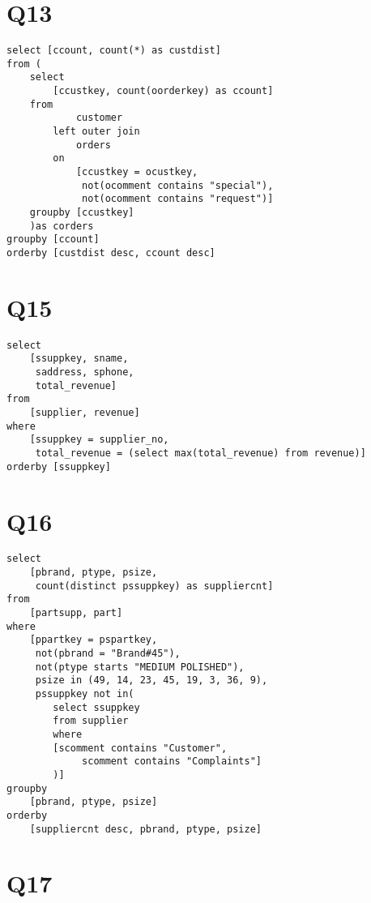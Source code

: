 \clearpage

\section*{Q13}
\label{sec:Q13}

\begin{lstlisting}
select [ccount, count(*) as custdist]
from (
	select
		[ccustkey, count(oorderkey) as ccount]
	from
			customer 
		left outer join 
			orders 
		on
			[ccustkey = ocustkey,
			 not(ocomment contains "special"),
			 not(ocomment contains "request")]
	groupby	[ccustkey]
	)as corders
groupby	[ccount]
orderby	[custdist desc,	ccount desc]
\end{lstlisting}

\clearpage

\section*{Q15}
\label{sec:Q15}

\begin{lstlisting}
select
	[ssuppkey, sname,
	 saddress, sphone,
	 total_revenue]
from
	[supplier, revenue]
where
	[ssuppkey = supplier_no,
	 total_revenue = (select max(total_revenue)	from revenue)]
orderby [ssuppkey]
\end{lstlisting}

\clearpage

\section*{Q16}
\label{sec:Q16}

\begin{lstlisting}
select
	[pbrand, ptype, psize,
	 count(distinct pssuppkey) as suppliercnt]
from
	[partsupp, part]
where
	[ppartkey = pspartkey,
	 not(pbrand = "Brand#45"),
	 not(ptype starts "MEDIUM POLISHED"),
	 psize in (49, 14, 23, 45, 19, 3, 36, 9),
	 pssuppkey not in(
		select ssuppkey
		from supplier
		where
    	[scomment contains "Customer",
			 scomment contains "Complaints"]
		)]
groupby
	[pbrand, ptype, psize]
orderby
	[suppliercnt desc, pbrand, ptype, psize]
\end{lstlisting}

\clearpage

\section*{Q17}
\label{sec:Q17}

